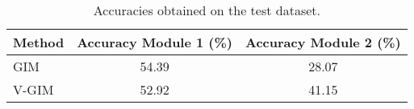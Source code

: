 		\begin{table}
			\centering
			\renewcommand{\arraystretch}{1.2} %
			\begin{tabular}{|l|c|c|}
				\hline
				\textbf{Method} & \textbf{Accuracy Module 1 (\%)} & \textbf{Accuracy Module 2 (\%)} \\ \hline
				GIM         	& 54.39	& 28.07             \\ \hline
				V-GIM         	& 52.92 	& 41.15             \\ \hline
			\end{tabular}
			\caption{Accuracies obtained on the test dataset.}
			\label{tab:classifier_accuracies}
		\end{table}